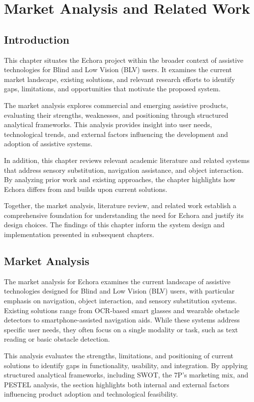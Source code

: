 \chapter{Market Analysis and Related Work}
\label{ch:ma}

\section{Introduction}
This chapter situates the Echora project within the broader context of assistive technologies for Blind and Low Vision (BLV) users. It examines the current market landscape, existing solutions, and relevant research efforts to identify gaps, limitations, and opportunities that motivate the proposed system.

The market analysis explores commercial and emerging assistive products, evaluating their strengths, weaknesses, and positioning through structured analytical frameworks. This analysis provides insight into user needs, technological trends, and external factors influencing the development and adoption of assistive systems.

In addition, this chapter reviews relevant academic literature and related systems that address sensory substitution, navigation assistance, and object interaction. By analyzing prior work and existing approaches, the chapter highlights how Echora differs from and builds upon current solutions.

Together, the market analysis, literature review, and related work establish a comprehensive foundation for understanding the need for Echora and justify its design choices. The findings of this chapter inform the system design and implementation presented in subsequent chapters.


\section{Market Analysis}

The market analysis for Echora examines the current landscape of assistive technologies designed for Blind and Low Vision (BLV) users, with particular emphasis on navigation, object interaction, and sensory substitution systems. Existing solutions range from OCR-based smart glasses and wearable obstacle detectors to smartphone-assisted navigation aids. While these systems address specific user needs, they often focus on a single modality or task, such as text reading or basic obstacle detection.

This analysis evaluates the strengths, limitations, and positioning of current solutions to identify gaps in functionality, usability, and integration. By applying structured analytical frameworks, including SWOT, the 7P’s marketing mix, and PESTEL analysis, the section highlights both internal and external factors influencing product adoption and technological feasibility.

